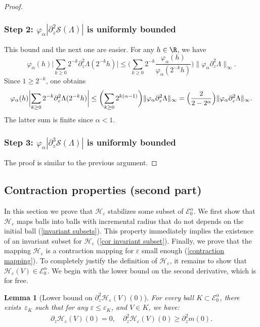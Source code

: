 \documentclass[JEP,XML,SOM,Unicode]{cedram}
\let\mathcal\mathscr
\newcommand{\cS}{\mathcal{S}}
\theoremstyle{plain}
\newtheorem{lem}[thm]{Lemma}
\theoremstyle{definition}
\renewcommand{\H}{\mathcal{H}_\eps}
\let\eps\varepsilon
\newcommand{\abs}[1]{\left\lvert#1\right\rvert}
\newcommand{\bbabs}[1]{\biggl\lvert#1\biggr\rvert}
\newcommand{\Ea}{\mathcal{E}^\alpha}
\newcommand{\Eaz}{\mathcal{E}^\alpha_0}
\newcommand{\vphia}{\varphi_\alpha}
\begin{document}
\begin{proof}
\subsubsection*{Step 2: $ \vphia\abs{ \partial_z^2 \cS(\Lambda)} $ is uniformly bounded} This bound and the next one are easier.
For any $h \in \R $, we have
\begin{equation*}
\vphia(h) \bbabs{ \sum_{k\geq 0} 2^{-k} \partial_z^2 \Lambda (2^{-k}h) } \leq \biggl (\sum_{k \geq 0} 2^{-k} \dfrac{\vphia(h)}{\vphia(2^{-k}h)} \biggr) \|\vphia \partial_z^2 \Lambda \|_{\infty}.
\end{equation*}
Since $1\geq 2^{-k}$, one obtains
\begin{equation*}
\vphia(h) \bbabs{ \sum_{k\geq 0} 2^{-k} \partial_z^2 \Lambda (2^{-k}h) } \leq \biggl(\sum_{k \geq 0} 2^{k (\alpha-1)} \biggr) \|\vphia \partial_z^2 \Lambda \|_{\infty} = \Bigl (\dfrac{2}{2 - 2^\alpha} \Bigr) \|\vphia \partial_z^2 \Lambda \|_{\infty}.
\end{equation*}
The latter sum is finite since $\alpha<1$.

\subsubsection*{Step 3: $ \vphia\abs{ \partial_z^3 \cS(\Lambda)} $ is uniformly bounded} The proof is similar to the previous argument.
\end{proof}

\subsection{Contraction properties (second part)}\label{sec cotraction properties}
In this section we prove that $\H$ stabilizes some subset of $\Ea_0$. We first show that $\H$ maps balls into balls with incremental radius that do not depends on the initial ball (\cref{invariant subsets}). This property immediately implies the existence of an invariant subset for $\H$ (\cref{cor invariant subset}). Final\-ly, we prove that the mapping $\H$ is a contraction mapping for $\eps$ small enough (\cref{contraction mapping}).
To completely justify the definition of $\H$, it remains to show that $\H(V) \in \Eaz$. We begin with the lower bound on the second derivative, which is for free.

\begin{lem}[Lower bound on $\partial_z^2 \H(V)(0)$]\label{lowerbound p2HV}
For every ball $K\subset \Eaz$, there exists~$\eps_K$ such that for any $\eps \leq \eps_K$, and $V \in K$, we have:
\begin{align*}
\partial_z \H(V)(0) = 0, \quad \partial_z^2 \H(V)(0) \geq \partial_z^2 m(0).
\end{align*}
\end{lem}
\end{document}
